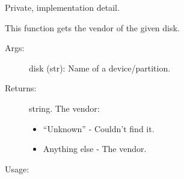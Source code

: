 \documentclass[letterpaper,10pt,english]{sphinxmanual}
\begin{document}
\begin{fulllineitems}
\label{\detokenize{macos:getdevinfo.macos.get_vendor}}
Private, implementation detail.

This function gets the vendor of the given disk.
\begin{description}
\item[{Args:}] \leavevmode
disk (str):   Name of a device/partition.

\item[{Returns:}] \leavevmode
string. The vendor:
\begin{itemize}
\item {} 
“Unknown”     - Couldn’t find it.

\item {} 
Anything else - The vendor.

\end{itemize}

\end{description}

Usage:

\begin{sphinxVerbatim}[commandchars=\\\{\}]
  
\end{sphinxVerbatim}

\end{fulllineitems}

\end{document}
